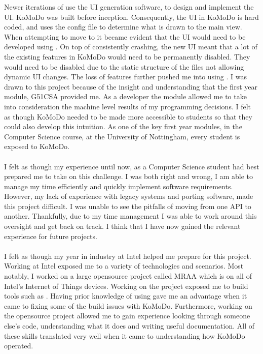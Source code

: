 %
Newer iterations of  use the UI generation software,  to design and implement the UI. KoMoDo was built before  inception. Consequently, the UI in KoMoDo is hard coded, and uses the  config file to determine what is drawn to the main view. When attempting to move to  it became evident that the UI would need to be developed using . On top of  consistently crashing, the new UI meant that a lot of the existing features in KoMoDo would need to be permanently disabled. They would need to be disabled due to the static structure of the  files not allowing dynamic UI changes. The loss of features further pushed me into using .
%
%
%
%
I was drawn to this project because of the insight and understanding that the first year module, G51CSA provided me. As a developer the module allowed me to take into consideration the machine level results of my programming decisions. I felt as though KoMoDo needed to be made more accessible to students so that they could also develop this intuition. As one of the key first year modules, in the Computer Science course, at the University of Nottingham, every student is exposed to KoMoDo.\\\\
%
I felt as though my experience until now, as a Computer Science student had best prepared me to take on this challenge. I was both right and wrong, I am able to manage my time efficiently and quickly implement software requirements. However, my lack of experience with legacy systems and porting software, made this project difficult. I was unable to see the pitfalls of moving from one API to another. Thankfully, due to my time management I was able to work around this oversight and get back on track. I think that I have now gained the relevant experience for future projects.\\\\
%
I felt as though my year in industry at Intel helped me prepare for this project. Working at Intel exposed me to a variety of technologies and scenarios. Most notably, I worked on a large opensource project called MRAA which is on all of Intel's Internet of Things devices. Working on the project exposed me to build tools such as . Having prior knowledge of using  gave me an advantage when it came to fixing some of the build issues with KoMoDo. Furthermore, working on the opensource project allowed me to gain experience looking through someone else's code, understanding what it does and writing useful documentation. All of these skills translated very well when it came to understanding how KoMoDo operated.\\\\
